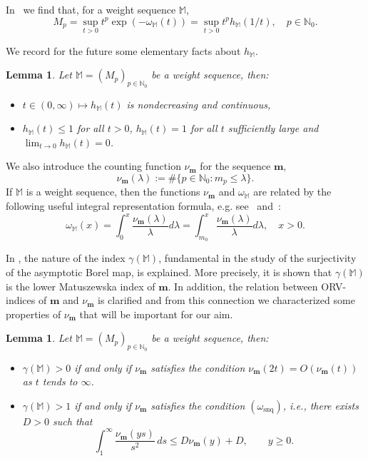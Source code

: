 \documentclass[11pt,a4paper]{article}
\theoremstyle{plain}
\newtheorem{lemma}[theo]{Lemma}
\theoremstyle{definition}
\newcommand{\N}{\mathbb{N}}
\newcommand{\M}{\mathbb{M}}
\newcommand{\m}{\boldsymbol{m}}
\def\o{\omega}
\begin{document}
In~\cite[Prop.~3.2]{komatsu} we find that, for a weight sequence $\M$,
\begin{equation}\label{eq.MpfromomegaM}
M_p=\sup_{t>0}t^p\exp(-\o_{\M}(t))=\sup_{t>0}t^p h_{\M}(1/t),\quad p\in\N_0.
\end{equation}

We record for the future some elementary facts about $h_{\M}$.

\begin{lemma}\label{functionhproperties}
Let $\M=(M_p)_{p\in\N_0}$ be a weight sequence, then:
\begin{itemize}
\item[$(i)$] $t\in(0,\infty)\mapsto h_\M(t)$ is nondecreasing and continuous,
\item[$(ii)$] $h_{\M}(t)\le 1$ for all $t>0$, $h_\M(t)=1$ for all $t$ sufficiently large and $\lim_{t\rightarrow 0}h_\M(t)=0$.
\end{itemize}
\end{lemma}

We also introduce the counting function $\nu_{\m}$ for the sequence $\m$,
\begin{equation}\label{countinfunctionnu}
\nu_{\m}(\lambda):=\#\{p\in\N_0: m_p\le\lambda\}.
\end{equation}
If $\M$ is a weight sequence, then the functions $\nu_{\m}$ and $\omega_{\M}$ are related by the following useful integral representation formula, e.g. see~\cite{Mandelbrojt}
and~\cite[$(3.11)$]{komatsu}:
\begin{equation}\label{assofuncintegral}
\omega_\M(x)= \int_0^{x}\frac{\nu_{\m}(\lambda)}{\lambda}d\lambda= \int_{m_0}^{x}\frac{\nu_{\m}(\lambda)}{\lambda}d\lambda,\quad x>0.
\end{equation}

In \cite{JimenezSanzSchindlIndex}, the nature of the index $\gamma(\M)$, fundamental in the study of the surjectivity of the asymptotic Borel map, is explained. More precisely, it is shown that $\gamma(\M)$ is the lower Matuszewska index  of $\m$. In addition, the relation between ORV-indices of $\m$ and $\nu_{\m}$ is clarified and from this connection we characterized some properties of $\nu_{\m}$ that will be important for our aim.

\begin{lemma}\label{functionNUproperties}
Let $\M=(M_p)_{p\in\N_0}$ be a weight sequence, then:
\begin{itemize}
\item[$(i)$] $\gamma(\M)>0$ if and only if $\nu_{\m}$ satisfies the condition $\nu_{\m}(2t)=O(\nu_{\m}(t))$ as $t$ tends to $\infty$.
\item[$(ii)$] $\gamma(\M)>1$ if and only if $\nu_{\m}$ satisfies the condition $(\omega_{\text{snq}})$, i.e., there exists $D>0$ such that
	\begin{equation*}
		\int_1^\infty \frac{\nu_{\m}(ys)}{s^2}\,ds\leq D\nu_{\m}(y)+D, \qquad y\geq 0.
	\end{equation*}
\end{itemize}
\end{lemma}
\end{document}
